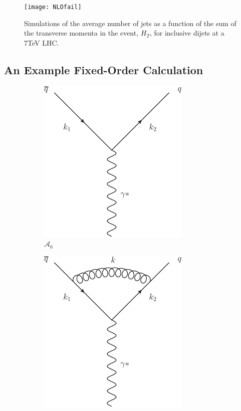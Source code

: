 		\begin{figure}[hbt]
			\centering
			\texttt{[image: NLOfail]}
			\caption{Simulations of the average number of jets as a function of the sum of the transverse momenta in the event, $H_T$,
			         for inclusive dijets at a 7TeV LHC.}
			\label{fig:NLO3jets}
  		\end{figure}

	\subsection{An Example Fixed-Order Calculation}

		\begin{figure}[tpb]

			\centering

			\begin{subfigure}[b]{0.48\textwidth}
				\includegraphics[width=0.8\textwidth]{TreeLevel}
				\caption{$\mathcal{A}_0$}
				\label{fig:NLOfig_1}
			\end{subfigure}
			\begin{subfigure}[b]{0.48\textwidth}
				\includegraphics[width=0.8\textwidth]{NLOVirtual}

\end{subfigure}
\end{figure}
